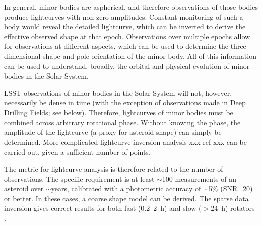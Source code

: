 %

In general, minor bodies are aspherical, and therefore observations of
those bodies produce lightcurves with non-zero amplitudes. Constant
monitoring of such a body would reveal the detailed lightcurve, which
can be inverted to derive the effective observed shape at that epoch.
Observations over multiple epochs allow for observations at different
aspects, which can be used to determine the three dimensional shape and
pole orientation of the minor body. All of this information can be used
to understand, broadly, the orbital and physical evolution of minor
bodies in the Solar System.

LSST observations of minor bodies in the Solar System will not, however,
necessarily be dense in time (with the exception of observations made in
Deep Drilling Fields; see below). Therefore, lightcurves of minor bodies
must be combined across arbitrary rotational phase. Without knowing the
phase, the amplitude of the lightcurve (a proxy for asteroid shape) can
simply be determined. More complicated lightcurve inversion analysis xxx
ref xxx can be carried out, given a sufficient number of points.


%

The metric for lightcurve analysis is therefore related to the number of
observations. The specific requirement is at least $\sim$100
measurements of an asteroid over $\sim$years, calibrated with a
photometric accuracy of $\sim$5\% (SNR=20) or better. In these cases, a
coarse shape model can be derived. The sparse data inversion gives
correct results for both fast (0.2--2~h) and slow ($>$24~h) rotators
\citep{2007IAUS..236..191D}.


%

